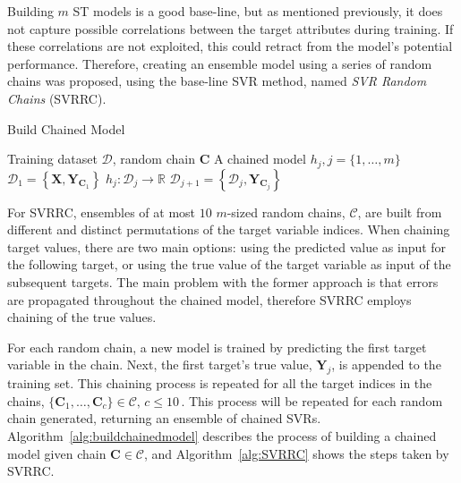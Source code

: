 \documentclass[reqno]{vcuthesis}
\newcommand{\set}[1]{{\left\{#1\right\}}}
\numberwithin{equation}{chapter}
\begin{document}
Building $m$ ST models is a good base-line, but as mentioned previously, it does not capture possible correlations between the target attributes during training. If these correlations are not exploited, this could retract from the model's potential performance. Therefore, creating an ensemble model using a series of random chains was proposed, using the base-line SVR method, named \textit{SVR Random Chains} (SVRRC). 
\begin{algorithm}[t!]
\centering \small
\caption{Build Chained Model}
\label{alg:buildchainedmodel} 
\begin{algorithmic}[1]
\renewcommand{\algorithmicrequire}{\textbf{Input:}}
\renewcommand{\algorithmicensure}{\textbf{Output:}}
\Require Training dataset $\mathcal{D}$, random chain $\bm C$
\Ensure  A chained model $h_j, j = \{1,\ldots,m\}$
\State $\mathcal{D}_1 = \set{\bm X, \bm Y_{\bm C_1}}$ 
 
\State $h_j : \mathcal{D}_j \rightarrow \mathbb{R}$ 
\State $\mathcal{D}_{j+1} = \set{\mathcal{D}_j, \bm Y_{\bm C_j}}$ 
\EndIf
\EndFor 
\end{algorithmic} 
\end{algorithm}

For SVRRC, ensembles of at most $10$ $m$-sized random chains, $\mathcal{C}$, are built from different and distinct permutations of the target variable indices. When chaining target values, there are two main options: using the predicted value as input for the following target, or using the true value of the target variable as input of the subsequent targets. The main problem with the former approach is that errors are propagated throughout the chained model, therefore SVRRC employs chaining of the true values. 

For each random chain, a new model is trained by predicting the first target variable in the chain. Next, the first target's true value, $\bm Y_j$, is appended to the training set. This chaining process is repeated for all the target indices in the chains, $\{\bm C_1, \ldots, \bm C_c\} \in \mathcal{C}, \, c \leq 10 \,$. This process will be repeated for each random chain generated, returning an ensemble of chained SVRs. Algorithm~\ref{alg:buildchainedmodel} describes the process of building a chained model given chain $\bm C \in \mathcal{C}$, and Algorithm~\ref{alg:SVRRC} shows the steps taken by SVRRC. 
\end{document}

